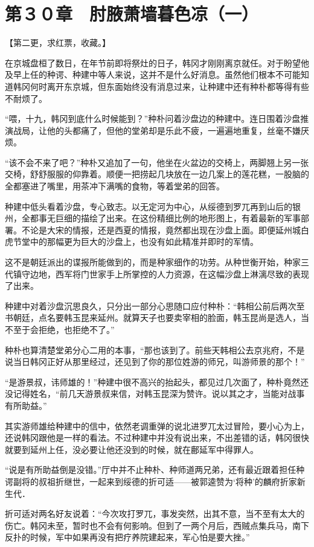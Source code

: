 \section{第３０章　肘腋萧墙暮色凉（一）}

【第二更，求红票，收藏。】

在京城盘桓了数日，在年节前即将祭灶的日子，韩冈才刚刚离京就任。对于盼望他及早上任的种谔、种建中等人来说，这并不是什么好消息。虽然他们根本不可能知道韩冈何时离开东京城，但东面始终没有消息过来，让种建中还有种朴都等得有些不耐烦了。

“喂，十九，韩冈到底什么时候能到？”种朴问着沙盘边的种建中。连日围着沙盘推演战局，让他的头都痛了，但他的堂弟却是乐此不疲，一遍遍地重复，丝毫不嫌厌烦。

“该不会不来了吧？”种朴又追加了一句，他坐在火盆边的交椅上，两脚翘上另一张交椅，舒舒服服的仰靠着。顺便一把捞起几块放在一边几案上的莲花糕，一股脑的全都塞进了嘴里，用茶冲下满嘴的食物，等着堂弟的回答。

种建中低头看着沙盘，专心致志。以无定河为中心，从绥德到罗兀再到山后的银州，全都事无巨细的描绘了出来。在这份精细比例的地形图上，有着最新的军事部署。不论是大宋的情报，还是西夏的情报，竟然都出现在沙盘上面。即便延州城白虎节堂中的那幅更为巨大的沙盘上，也没有如此精准并即时的军情。

这不是朝廷派出的谍报所能做到的，而是种家细作的功劳。从种世衡开始，种家三代镇守边地，西军将门世家手上所掌控的人力资源，在这幅沙盘上淋漓尽致的表现了出来。

种建中对着沙盘沉思良久，只分出一部分心思随口应付种朴：“韩相公前后两次至书朝廷，点名要韩玉昆来延州。就算天子也要卖宰相的脸面，韩玉昆尚是选人，当不至于会拒绝，也拒绝不了。”

种朴也算清楚堂弟分心二用的本事，“那也该到了。前些天韩相公去京兆府，不是说当日韩冈正好从那里经过，还见到了你的那位姓游的师兄，叫游师景的那个！”

“是游景叔，讳师雄的！”种建中很不高兴的抬起头，都见过几次面了，种朴竟然还没记得姓名，“前几天游景叔来信，对韩玉昆深为赞许。说以其之才，当能对战事有所助益。”

其实游师雄给种建中的信中，依然老调重弹的说北进罗兀太过冒险，要小心为上，还说韩冈跟他是一样的看法。不过种建中并没有说出来，不出差错的话，韩冈很快就要到延州上任，没必要让他还没到的时候，就在鄜延军中得罪人。

“说是有所助益倒是没错。”厅中并不止种朴、种师道两兄弟，还有最近跟着担任种谔副将的叔祖折继世，一起来到绥德的折可适——被郭逵赞为‘将种’的麟府折家新生代．

折可适对两名好友说着：“今次攻打罗兀，事发突然，出其不意，当不至有太大的伤亡。韩冈未至，暂时也不会有何影响。但到了一两个月后，西贼点集兵马，南下反扑的时候，军中如果再没有把疗养院建起来，军心怕是要大挫。”

